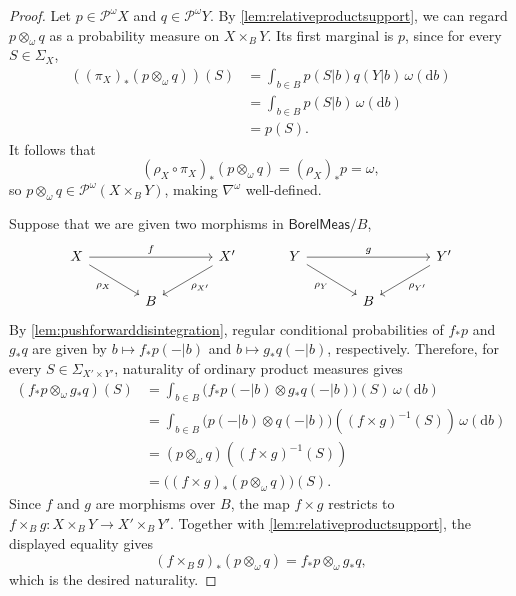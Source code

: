 \documentclass[11pt,a4paper]{scrartcl}
\newcommand{\borelmeas}{\mathsf{BorelMeas}}
\newcommand{\dx}{\mathrm{d}}
\newcommand{\giry}{\mathcal{P}}
\theoremstyle{definition}
\begin{document}
\begin{proof}
	Let $p \in \giry^\omega X$ and $q \in \giry^\omega Y$.
	By \cref{lem:relativeproductsupport}, we can regard $p \otimes_\omega q$ as a probability measure on $X \times_B Y$.
	Its first marginal is $p$, since for every $S \in \Sigma_X$,
	\begin{align*}
		((\pi_X)_\ast(p \otimes_\omega q))(S)
		&= \int_{b \in B} p(S|b)q(Y|b) \, \omega(\dx b) \\
		&= \int_{b \in B} p(S|b) \, \omega(\dx b) \\
		&= p(S).
	\end{align*}
	It follows that
	\[
		(\rho_X \circ \pi_X)_\ast(p \otimes_\omega q)
		= (\rho_X)_\ast p
		= \omega,
	\]
	so $p \otimes_\omega q \in \giry^\omega(X \times_B Y)$, making $\nabla^\omega$ well-defined.

	Suppose that we are given two morphisms in $\borelmeas/B$,
	\[
		\begin{tikzcd}[column sep=large]
			X \arrow[rr, "f"] \arrow[dr, "\rho_X"'] & & X' \arrow[dl, "\rho_{X'}"] \\
			& B &
		\end{tikzcd}
		\qquad\quad
		\begin{tikzcd}[column sep=large]
			Y \arrow[rr, "g"] \arrow[dr, "\rho_Y"'] & & Y' \arrow[dl, "\rho_{Y'}"] \\
			& B &
		\end{tikzcd}
	\]
	By \cref{lem:pushforwarddisintegration}, regular conditional probabilities of $f_\ast p$ and $g_\ast q$ are given by
	$b \mapsto f_\ast p(-|b)$ and $b \mapsto g_\ast q(-|b)$, respectively.
	Therefore, for every $S \in \Sigma_{X' \times Y'}$, naturality of ordinary product measures gives
	\begin{align*}
		(f_\ast p \otimes_\omega g_\ast q)(S)
		&= \int_{b \in B} \bigl(f_\ast p(-|b) \otimes g_\ast q(-|b)\bigr)(S) \, \omega(\dx b) \\
		&= \int_{b \in B} \bigl(p(-|b) \otimes q(-|b)\bigr)((f \times g)^{-1}(S)) \, \omega(\dx b) \\
		&= (p \otimes_\omega q)((f \times g)^{-1}(S)) \\
		&= \bigl((f \times g)_\ast(p \otimes_\omega q)\bigr)(S).
	\end{align*}
	Since $f$ and $g$ are morphisms over $B$, the map $f \times g$ restricts to
	$f \times_B g : X \times_B Y \to X' \times_B Y'$.
	Together with \cref{lem:relativeproductsupport}, the displayed equality gives
	\[
		(f \times_B g)_\ast(p \otimes_\omega q)
		= f_\ast p \otimes_\omega g_\ast q,
	\]
	which is the desired naturality.
\end{proof}
\end{document}
